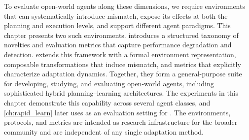To evaluate open-world agents along these dimensions, we require environments that can systematically introduce mismatch, expose its effects at both the planning and execution levels, and support different agent paradigms. This chapter presents two such environments. \NovelGridworlds{} introduces a structured taxonomy of novelties and evaluation metrics that capture performance degradation and detection. \NovelGym{} extends this framework with a formal environment representation, composable transformations that induce mismatch, and metrics that explicitly characterize adaptation dynamics. Together, they form a general-purpose suite for developing, studying, and evaluating open-world agents, including sophisticated hybrid planning--learning architectures. The experiments in this chapter demonstrate this capability across several agent classes, and \cref{ch:rapid_learn} later uses \NovelGridworlds{} as an evaluation setting for \RAPidLearn{}. The environments, protocols, and metrics are intended as research infrastructure for the broader community and are independent of any single adaptation method.
